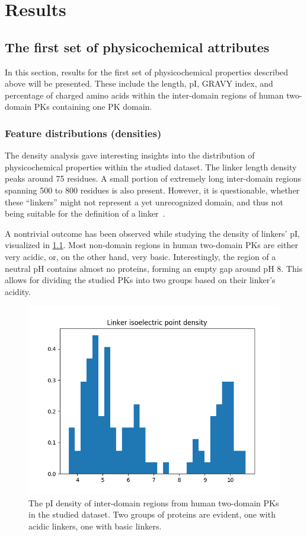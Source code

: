 \chapter{Results}
\label{res}

\section{The first set of physicochemical attributes}
\label{res:first}

	In this section, results for the first set of physicochemical properties described
	above will be presented.
	These include the length, pI, GRAVY index, and percentage of charged amino acids within
	the inter-domain regions of human two-domain PKs containing one PK domain.

	\subsection{Feature distributions (densities)}
	\label{res:first:dens}

		The density analysis gave interesting insights into the distribution of
		physicochemical properties within the studied dataset.
		The linker length density peaks around 75 residues.
		A small portion of extremely long inter-domain regions spanning 500 to 800 residues is
		also present.
		However, it is questionable, whether these ``linkers'' might not represent a yet
		unrecognized domain, and thus not being suitable for the definition of a
		linker~\cite{milano2016structural}.

		A nontrivial outcome has been observed while studying the density of linkers' pI,
		visualized in \cref{fig:iso-dens}.
		Most non-domain regions in human two-domain PKs are either very acidic, or, on the
		other hand, very basic.
		Interestingly, the region of a neutral pH contains almost no proteins, forming an
		empty gap around pH 8.
		This allows for dividing the studied PKs into two groups based on their linker's
		acidity.

		\begin{figure}
			\centering
			\includegraphics[width=.7\linewidth]{img/iso_density.png}
			\caption{The pI density of inter-domain regions from human two-domain PKs in the
			studied dataset.
			Two groups of proteins are evident, one with acidic linkers, one with basic
			linkers.}
			\label{fig:iso-dens}
		\end{figure}

